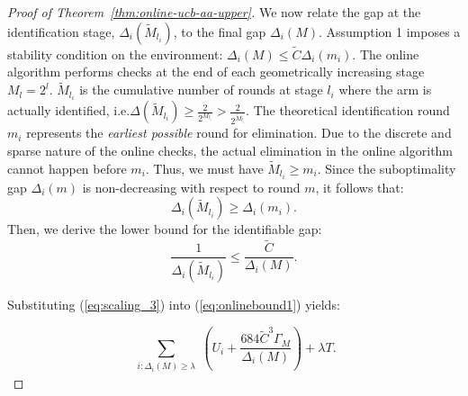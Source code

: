 \documentclass[11pt]{article}
\begin{document}
\begin{proof}[Proof of Theorem~\ref{thm:online-ucb-aa-upper}]
We now relate the gap at the identification stage, $\Delta_i(\tilde{M}_{l_i})$, to the final gap $\Delta_i(M)$. 
Assumption 1 imposes a stability condition on the environment: $\Delta_i(M) \le \tilde{C} \Delta_i(m_i)$. 
The online algorithm performs checks at the end of each geometrically increasing stage $M_l = 2^l$.  $\tilde{M}_{l_i}$ is the cumulative number of rounds at stage $l_i$ where the arm is actually identified, i.e.$\Delta(\tilde{M}_{l_i})\geq \frac{2}{2^{M_{l_i}}} > \frac{2}{2^{\tilde{M}_{l_i}}} $.
The theoretical identification round $m_i$ represents the \textit{earliest possible} round for elimination. Due to the discrete and sparse nature of the online checks, the actual elimination in the online algorithm cannot happen before $m_i$. Thus, we must have $\tilde{M}_{l_i} \ge m_i$. Since the suboptimality gap $\Delta_i(m)$ is non-decreasing with respect to round $m$, it follows that:
    \begin{equation*} \label{eq:scaling_2}
        \Delta_i(\tilde{M}_{l_i}) \ge \Delta_i(m_i).
    \end{equation*}
 Then, we derive the lower bound for the identifiable gap:
    \begin{equation}
    \label{eq:scaling_3}
        \frac{1}{\Delta_i(\tilde{M}_{l_i})} \le \frac{\tilde{C}}{\Delta_i(M)}.
    \end{equation}

Substituting (\ref{eq:scaling_3}) into (\ref{eq:onlinebound1}) yields:

\begin{equation*}
\sum_{\substack{i: \Delta_i(M) \geq \lambda}}
\left(
U_i
+\frac{684 \tilde{C}^3\Gamma_M}{\Delta_i(M)}
\right)+\lambda T.
\end{equation*}  
\end{proof}
\end{document}

